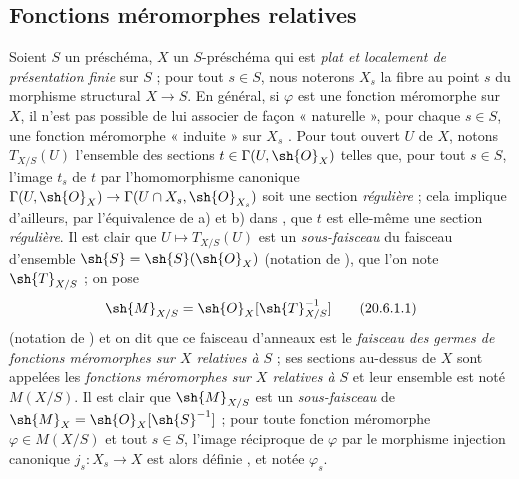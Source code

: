 \subsection{Fonctions méromorphes relatives}
\label{IV.20.6}

\begin{env}[20.6.1]
\label{IV.20.6.1}
Soient $S$ un préschéma, $X$ un $S$-préschéma qui est \emph{plat et localement de présentation finie} sur $S$ ; pour tout $s\in S$, nous noterons $X_s$ la fibre au point $s$ du morphisme structural $X\to S$.
En général, si $\varphi$ est une fonction méromorphe sur $X$, il n'est pas possible de lui associer de façon « naturelle », pour chaque $s\in S$, une fonction méromorphe « induite » sur $X_s$ .
Pour tout ouvert $U$ de $X$, notons $T_{X/S}(U)$ l'ensemble des sections $t\in\Gamma(U,\sh{O}_X)$ telles que, pour tout $s\in S$, l'image $t_s$ de $t$ par l'homomorphisme canonique $\Gamma(U,\sh{O}_X)\to\Gamma(U\cap X_s,\sh{O}_{X_s})$ soit une section \emph{régulière} ; cela implique d'ailleurs, par l'équivalence de a) et b) dans , que $t$ est elle-même une section \emph{régulière}.
Il est clair que $U\mapsto T_{X/S}(U)$ est un \emph{sous-faisceau} du faisceau d'ensemble $\sh{S}=\sh{S}(\sh{O}_X)$ (notation de ), que l'on note $\sh{T}_{X/S}$ ; on pose
\[
\label{IV.20.6.1.1}
  \sh{M}_{X/S}=\sh{O}_X[\sh{T}_{X/S}^{-1}]
  \tag{20.6.1.1}
\]
(notation de ) et on dit que ce faisceau d'anneaux est le \emph{faisceau des germes de fonctions méromorphes sur $X$ relatives à $S$} ; ses sections au-dessus de $X$ sont appelées les \emph{fonctions méromorphes sur $X$ relatives à $S$} et leur ensemble est noté $M(X/S)$.
Il est clair que $\sh{M}_{X/S}$ est un \emph{sous-faisceau} de $\sh{M}_X=\sh{O}_X[\sh{S}^{-1}]$ ; pour toute fonction méromorphe $\varphi\in M(X/S)$ et tout $s\in S$, l'image réciproque de $\varphi$ par le morphisme injection canonique $j_s:X_s\to X$ est alors définie , et notée $\varphi_s$.
\end{env}

